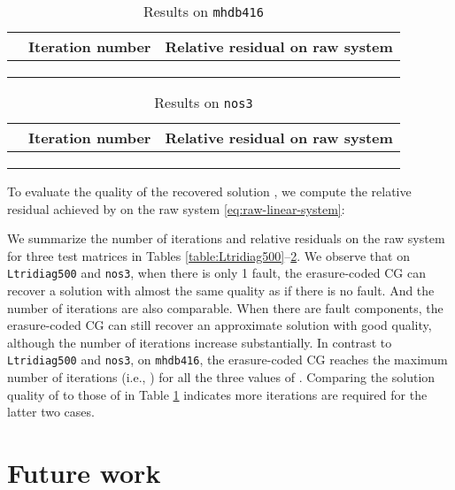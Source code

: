 \documentclass[11pt]{article}
\begin{document}
\begin{table}[t]
\caption{{Results on {\tt mhdb416}}}
\begin{center}
\begin{tabular}{lll}
  \toprule
   & Iteration number & Relative residual on raw system\\
  \midrule
   &  &  \\
   &  &  \\
   &  & \\
  \bottomrule
 \end{tabular}
\end{center}
\label{table:mhdb416}
\end{table}

\begin{table}[t]
\caption{{Results on {\tt nos3}}}
\begin{center}
\begin{tabular}{lll}
  \toprule
   & Iteration number & Relative residual on raw system \\
  \midrule
   &  &  \\
   &  &  \\
   &  & \\
  \bottomrule
 \end{tabular}
\end{center}
\label{table:nos3}
\end{table}

To evaluate the quality of the recovered solution , we compute the relative residual achieved by  on the raw system \eqref{eq:raw-linear-system}: 
 
We summarize the number of iterations and relative residuals on the raw system for three test matrices in Tables \ref{table:Ltridiag500}--\ref{table:nos3}. We observe that on {\tt Ltridiag500} and {\tt nos3}, when there is only 1 fault, the erasure-coded CG can recover a solution with almost the same quality as if there is no fault. And the number of iterations are also comparable. When there are  fault components, the erasure-coded CG can still recover an approximate solution with good quality, although the number of iterations increase substantially. In contrast to {\tt Ltridiag500} and {\tt nos3}, on {\tt mhdb416}, the erasure-coded CG reaches the maximum number of iterations (i.e., ) for all the three values of . Comparing the solution quality of  to those of  in Table \ref{table:mhdb416} indicates more iterations are required for the latter two cases.

\section{Future work}
\end{document}
